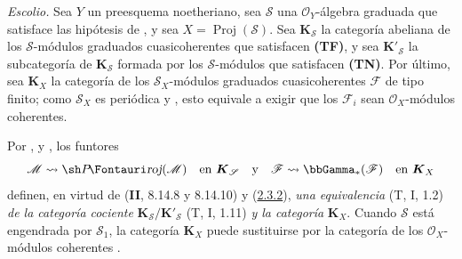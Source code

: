 \begin{env}[2.3.3]
\label{III.2.3.3}
\label{III.2.3.3-fr}
\emph{Escolio.}
Sea $Y$ un preesquema noetheriano, sea $\mathcal S$ una $\mathcal O_Y$-álgebra graduada que satisface las hipótesis de , y sea $X=\operatorname{Proj}(\mathcal S)$.
Sea $\boldsymbol{K}_{\mathcal S}$ la categoría abeliana de los $\mathcal S$-módulos graduados cuasicoherentes que satisfacen \textbf{(TF)}, y sea $\boldsymbol{K}'_{\mathcal S}$ la subcategoría de $\boldsymbol{K}_{\mathcal S}$ formada por los $\mathcal S$-módulos que satisfacen \textbf{(TN)}.
Por último, sea $\boldsymbol{K}_X$ la categoría de los $\mathcal S_X$-módulos graduados cuasicoherentes $\mathcal F$ de tipo finito; como $\mathcal S_X$ es periódica  y , esto equivale a exigir que los $\mathcal F_i$ sean $\mathcal O_X$-módulos coherentes.

Por ,  y , los funtores
\[
\mathcal M\leadsto\shProj(\mathcal M)
\quad\text{en }\boldsymbol{K}_{\mathcal S}
\quad\text{y}\quad
\mathcal F\leadsto\bbGamma_*(\mathcal F)
\quad\text{en }\boldsymbol{K}_X
\] definen, en virtud de (\textbf{II}, 8.14.8 y 8.14.10) y (\hyperref[III.2.3.2-fr]{2.3.2}), \emph{una equivalencia} (T, I, 1.2) \emph{de la categoría cociente} $\boldsymbol{K}_{\mathcal S}/\boldsymbol{K}'_{\mathcal S}$
(T, I, 1.11) \emph{y la categoría} $\boldsymbol{K}_X$.
Cuando $\mathcal S$ está engendrada por $\mathcal S_1$, la categoría $\boldsymbol{K}_X$ puede sustituirse por la categoría de los $\mathcal O_X$-módulos coherentes .
\end{env}

